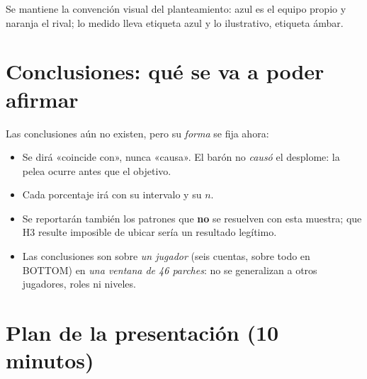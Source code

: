\documentclass[11pt,letterpaper]{article}
\begin{document}
\noindent Se mantiene la convención visual del planteamiento: \textcolor{azul}{azul}
es el equipo propio y \textcolor{naranja}{naranja} el rival; lo medido lleva etiqueta
azul y lo ilustrativo, etiqueta ámbar.

\section{Conclusiones: qué se va a poder afirmar}

Las conclusiones aún no existen, pero su \emph{forma} se fija ahora:

\begin{itemize}[leftmargin=1.4em,itemsep=.3em]
  \item Se dirá «coincide con», nunca «causa». El barón no \emph{causó} el desplome:
        la pelea ocurre antes que el objetivo.
  \item Cada porcentaje irá con su intervalo y su \(n\).
  \item Se reportarán también los patrones que \textbf{no} se resuelven con esta
        muestra; que H3 resulte imposible de ubicar sería un resultado legítimo.
  \item Las conclusiones son sobre \emph{un jugador} (seis cuentas, sobre todo en
        BOTTOM) en \emph{una ventana de 46 parches}: no se generalizan a otros
        jugadores, roles ni niveles.
\end{itemize}

\section{Plan de la presentación (10 minutos)}
\end{document}
